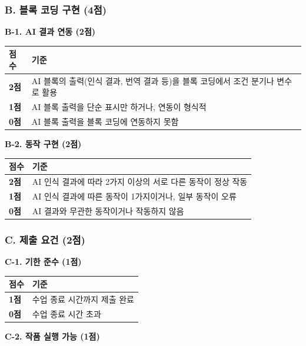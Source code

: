 \documentclass[a4paper,11pt]{ltjsarticle}
\begin{document}
\subsubsection{B. 블록 코딩 구현 (4점)}

\textbf{B-1. AI 결과 연동 (2점)}

\noindent
\begin{tabularx}{\textwidth}{|>{\centering\arraybackslash}p{1cm}|X|}
\hline
\textbf{점수} & \textbf{기준} \\ \hline
\textbf{2점} & AI 블록의 출력(인식 결과, 번역 결과 등)을 블록 코딩에서 조건 분기나 변수로 활용 \\ \hline
\textbf{1점} & AI 블록 출력을 단순 표시만 하거나, 연동이 형식적 \\ \hline
\textbf{0점} & AI 블록 출력을 블록 코딩에 연동하지 못함 \\ \hline
\end{tabularx}

\vspace{0.3em}
\textbf{B-2. 동작 구현 (2점)}

\noindent
\begin{tabularx}{\textwidth}{|>{\centering\arraybackslash}p{1cm}|X|}
\hline
\textbf{점수} & \textbf{기준} \\ \hline
\textbf{2점} & AI 인식 결과에 따라 2가지 이상의 서로 다른 동작이 정상 작동 \\ \hline
\textbf{1점} & AI 인식 결과에 따른 동작이 1가지이거나, 일부 동작이 오류 \\ \hline
\textbf{0점} & AI 결과와 무관한 동작이거나 작동하지 않음 \\ \hline
\end{tabularx}

\subsubsection{C. 제출 요건 (2점)}

\textbf{C-1. 기한 준수 (1점)}

\noindent
\begin{tabularx}{\textwidth}{|>{\centering\arraybackslash}p{1cm}|X|}
\hline
\textbf{점수} & \textbf{기준} \\ \hline
\textbf{1점} & 수업 종료 시간까지 제출 완료 \\ \hline
\textbf{0점} & 수업 종료 시간 초과 \\ \hline
\end{tabularx}

\vspace{0.3em}
\textbf{C-2. 작품 실행 가능 (1점)}
\end{document}

